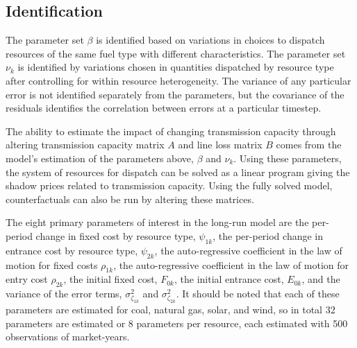 \documentclass[12pt]{article}
\begin{document}
\subsection{Identification}

The parameter set $\beta$ is identified based on variations in choices to dispatch resources of the same fuel type with different characteristics. The parameter set $\nu_k$ is identified by variations chosen in quantities dispatched by resource type after controlling for within resource heterogeneity. The variance of any particular error is not identified separately from the parameters, but the covariance of the residuals identifies the correlation between errors at a particular timestep. 

The ability to estimate the impact of changing transmission capacity through altering transmission capacity matrix $A$ and line loss matrix $B$ comes from the model's estimation of the parameters above, $\beta$ and $\nu_k$. Using these parameters, the system of resources for dispatch can be solved as a linear program giving the shadow prices related to transmission capacity. Using the fully solved model, counterfactuals can also be run by altering these matrices.

The eight primary parameters of interest in the long-run model are the per-period change in fixed cost by resource type, $\psi_{1k}$, the per-period change in entrance cost by resource type, $\psi_{2k}$, the auto-regressive coefficient in the law of motion for fixed costs $\rho_{1k}$, the auto-regressive coefficient in the law of motion for entry cost $\rho_{2k}$, the initial fixed cost, $F_{0k}$, the initial entrance cost, $E_{0k}$, and the variance of the error terms, $\sigma^2_{\zeta_{1k}}$ and $\sigma^2_{\zeta_{2k}}$. It should be noted that each of these parameters are estimated for coal, natural gas, solar, and wind, so in total 32 parameters are estimated or 8 parameters per resource, each estimated with 500 observations of market-years.
\end{document}
